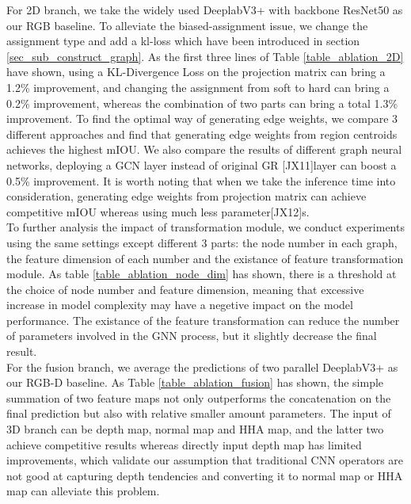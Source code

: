 ﻿\documentclass[journal]{IEEEtran}
\begin{document}
    For 2D branch, we take the widely used DeeplabV3+ with backbone ResNet50 as our RGB baseline. To alleviate the biased-assignment issue, we change the assignment type and add a kl-loss which have been introduced in section \ref{sec_sub_construct_graph}. As the first three lines of Table \ref{table_ablation_2D} have shown, using a KL-Divergence Loss on the projection matrix can bring a 1.2\% improvement, and changing the assignment from soft to hard can bring a 0.2\% improvement, whereas the combination of two parts can bring a total 1.3\% improvement. To find the optimal way of generating edge weights, we compare 3 different approaches and find that generating edge weights from region centroids achieves the highest mIOU. We also compare the results of different graph neural networks, deploying a GCN layer instead of original GR [JX11]layer can boost a 0.5\% improvement. It is worth noting that when we take the inference time into consideration, generating edge weights from projection matrix can achieve competitive mIOU whereas using much less parameter[JX12]s. \\

    To further analysis the impact of transformation module, we conduct experiments using the same settings except different 3 parts: the node number in each graph, the feature dimension of each number and the existance of feature transformation module. As table \ref{table_ablation_node_dim} has shown, there is a threshold at the choice of node number and feature dimension, meaning that excessive increase in model complexity may have a negetive impact on the model performance. The existance of the feature transformation can reduce the number of parameters involved in the GNN process, but it slightly decrease the final result. \\


    For the fusion branch, we average the predictions of two parallel DeeplabV3+ as our RGB-D baseline. As Table \ref{table_ablation_fusion} has shown, the simple summation of two feature maps not only outperforms the concatenation on the final prediction but also with relative smaller amount parameters. The input of 3D branch can be depth map, normal map and HHA map, and the latter two achieve competitive results whereas directly input depth map has limited improvements, which validate our assumption that traditional CNN operators are not good at capturing depth tendencies and converting it to normal map or HHA map can alleviate this problem.
\end{document}
